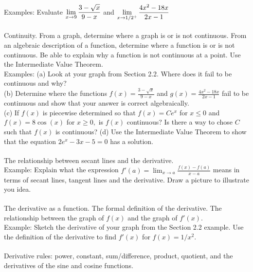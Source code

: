 \documentclass[11pt,fleqn]{article}
\begin{document}
\noindent Examples: Evaluate $\displaystyle \lim_{x \to 9} \frac{3-\sqrt{x}}{9-x}$ and $\displaystyle \lim_{x \to 1/2^+} \frac{4x^2-18x}{2x-1}$\\

\noindent {}\\
Continuity. From a graph, determine where a graph is or is not continuous. From an algebraic description of a function, determine where a function is or is not continuous. Be able to explain why a function is not continuous at a point. Use the Intermediate Value Theorem.\\

\noindent Examples: 
(a) Look at your graph from Section 2.2. Where does it fail to be continuous and why? \\
(b) Determine where the functions $f(x)= \frac{3-\sqrt{x}}{9-x}$ and $g(x)=  \frac{4x^2-18x}{2x-1}$ fail to be continuous and show that your answer is correct algebraically.\\
(c) If $f(x)$ is piecewise determined so that $f(x) =Ce^x$ for $x\leq 0$ and $f(x)=8 \cos(x)$ for $x \geq 0,$ is $f(x)$ continuous? Is there a way to chose $C$ such that $f(x)$ is continuous?
(d) Use the Intermediate Value Theorem to show that the equation $2e^x-3x-5=0$ has a solution.\\

\noindent {}\\
The relationship between secant lines and the derivative.\\

\noindent Example: Explain what the expression $f'(a) = \lim_{x \to a} \frac{f(x)-f(a)}{x-a}$ means in terms of secant lines, tangent lines and the derivative. Draw a picture to illustrate you idea.\\

\noindent {}\\
The derivative as a function. The formal definition of the derivative. The relationship between the graph of $f(x)$ and the graph of $f'(x).$\\

\noindent Example: Sketch the derivative of your graph from the Section 2.2 example. Use the definition of the derivative to find $f'(x)$ for $f(x)=1/x^2.$\\

\noindent {}\\
Derivative rules: power, constant, sum/difference, product, quotient, and the derivatives of the sine and cosine functions.\\
\end{document}
